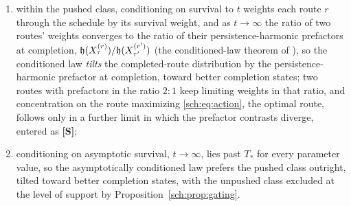 \begin{remark}
\begin{proposition}
\begin{enumerate}[label=\emph{(\roman*)},itemsep=2pt]
\begin{equation}
\;=\;\frac{\log(1/p)}{B}\,\bigl(1+o(1)\bigr)\qquad(p\to0),
\end{equation}
below which the conditioned law favors the unpushed class and above
which it favors the pushed class, the switch being sharp because one
weight is exponential in $t$ and the other polynomial: rarity of
pushing, however extreme, enters the threshold only through
$\log(1/p)$, so a one-in-a-trillion push moves $T_\ast$ by about
$28/B$ and no more;
\item within the pushed class, conditioning on survival to $t$ weights
each route $r$ through the schedule by its survival weight, and as
$t\to\infty$ the ratio of two routes' weights converges to the ratio of
their persistence-harmonic prefactors at completion,
$\mathfrak{h}(X^{(r)}_\tau)/\mathfrak{h}(X^{(r')}_{\tau'})$ (the conditioned-law theorem of \cite{GoldenSurvivorship}), so the
conditioned law \emph{tilts} the completed-route distribution by the
persistence-harmonic prefactor at completion, toward better completion
states; two routes with prefactors in the ratio $2{:}1$ keep limiting
weights in that ratio, and concentration on the route maximizing
\eqref{sch:eq:action}, the optimal route, follows only in a further
limit in which the prefactor contrasts diverge, entered as
\textbf{[S]};
\item conditioning on asymptotic survival, $t\to\infty$, lies past
$T_\ast$ for every parameter value, so the asymptotically conditioned
law prefers the pushed class outright, tilted toward better completion
states, with the unpushed class excluded at the level of support by
Proposition~\ref{sch:prop:gating}.
\end{enumerate}
\end{proposition}


\end{remark}
